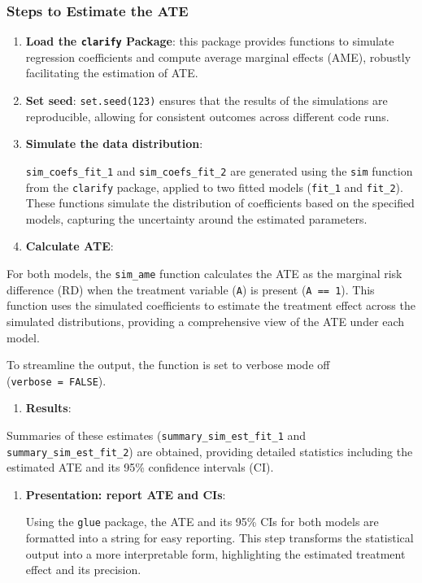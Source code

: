 \documentclass[
  singlecolumn]{article}
\providecommand{\tightlist}{%
  \setlength{\itemsep}{0pt}\setlength{\parskip}{0pt}}\usepackage{longtable,booktabs,array}
\begin{document}
\subsubsection{Steps to Estimate the
ATE}\label{steps-to-estimate-the-ate}

\begin{enumerate}
\def\labelenumi{\arabic{enumi}.}
\item
  \textbf{Load the \texttt{clarify} Package}: this package provides
  functions to simulate regression coefficients and compute average
  marginal effects (AME), robustly facilitating the estimation of ATE.
\item
  \textbf{Set seed}: \texttt{set.seed(123)} ensures that the results of
  the simulations are reproducible, allowing for consistent outcomes
  across different code runs.
\item
  \textbf{Simulate the data distribution}:

  \texttt{sim\_coefs\_fit\_1} and \texttt{sim\_coefs\_fit\_2} are
  generated using the \texttt{sim} function from the \texttt{clarify}
  package, applied to two fitted models (\texttt{fit\_1} and
  \texttt{fit\_2}). These functions simulate the distribution of
  coefficients based on the specified models, capturing the uncertainty
  around the estimated parameters.
\item
  \textbf{Calculate ATE}:
\end{enumerate}

For both models, the \texttt{sim\_ame} function calculates the ATE as
the marginal risk difference (RD) when the treatment variable
(\texttt{A}) is present (\texttt{A\ ==\ 1}). This function uses the
simulated coefficients to estimate the treatment effect across the
simulated distributions, providing a comprehensive view of the ATE under
each model.

To streamline the output, the function is set to verbose mode off
(\texttt{verbose\ =\ FALSE}).

\begin{enumerate}
\def\labelenumi{\arabic{enumi}.}
\setcounter{enumi}{4}
\tightlist
\item
  \textbf{Results}:
\end{enumerate}

Summaries of these estimates (\texttt{summary\_sim\_est\_fit\_1} and
\texttt{summary\_sim\_est\_fit\_2}) are obtained, providing detailed
statistics including the estimated ATE and its 95\% confidence intervals
(CI).

\begin{enumerate}
\def\labelenumi{\arabic{enumi}.}
\setcounter{enumi}{5}
\item
  \textbf{Presentation: report ATE and CIs}:

  Using the \texttt{glue} package, the ATE and its 95\% CIs for both
  models are formatted into a string for easy reporting. This step
  transforms the statistical output into a more interpretable form,
  highlighting the estimated treatment effect and its precision.
\end{enumerate}
\end{document}

